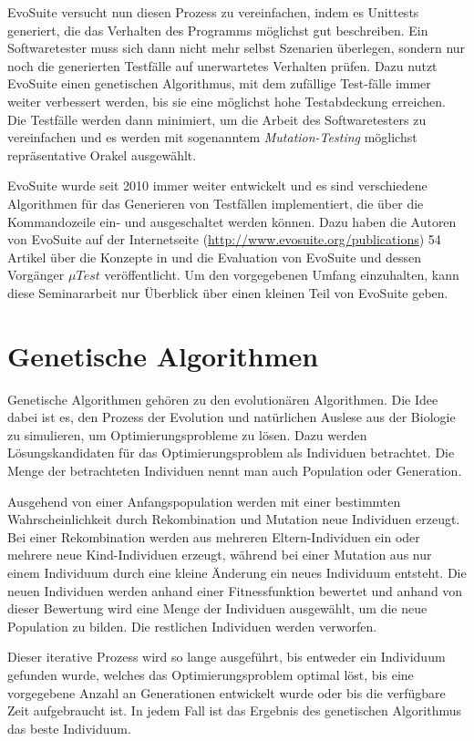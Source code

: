 \documentclass[a4paper,11pt]{article}
\begin{document}
EvoSuite versucht nun diesen Prozess zu vereinfachen, indem es Unittests generiert, die das Verhalten des Programms möglichst gut beschreiben.
Ein Softwaretester muss sich dann nicht mehr selbst Szenarien überlegen, sondern nur noch die generierten Testfälle auf unerwartetes Verhalten prüfen.
Dazu nutzt EvoSuite einen genetischen Algorithmus, mit dem zufällige Test-fälle immer weiter verbessert werden, bis sie eine möglichst hohe Testabdeckung erreichen.
Die Testfälle werden dann minimiert, um die Arbeit des Softwaretesters zu vereinfachen und es werden mit sogenanntem \textit{Mutation-Testing} möglichst repräsentative Orakel ausgewählt.

EvoSuite wurde seit 2010 immer weiter entwickelt und es sind verschiedene Algorithmen für das Generieren von Testfällen implementiert, die über die Kommandozeile ein- und ausgeschaltet werden können.
Dazu haben die Autoren von EvoSuite auf der Internetseite (\url{http://www.evosuite.org/publications}) 54 Artikel über die Konzepte in und die Evaluation von EvoSuite und dessen Vorgänger ${\mu}Test$ veröffentlicht.
Um den vorgegebenen Umfang einzuhalten, kann diese Seminararbeit nur Überblick über einen kleinen Teil von EvoSuite geben.

\section{Genetische Algorithmen}
\label{sec:genetische_algorithmen}

Genetische Algorithmen gehören zu den evolutionären Algorithmen.
Die Idee dabei ist es, den Prozess der Evolution und natürlichen Auslese aus der Biologie zu simulieren, um Optimierungsprobleme zu lösen.
Dazu werden Lösungskandidaten für das Optimierungsproblem als Individuen betrachtet.
Die Menge der betrachteten Individuen nennt man auch Population oder Generation.

Ausgehend von einer Anfangspopulation werden mit einer bestimmten Wahrscheinlichkeit durch Rekombination und Mutation neue Individuen erzeugt.
Bei einer Rekombination werden aus mehreren Eltern-Individuen ein oder mehrere neue Kind-Individuen erzeugt, während bei einer Mutation aus nur einem Individuum durch eine kleine Änderung ein neues Individuum entsteht.
Die neuen Individuen werden anhand einer Fitnessfunktion bewertet und anhand von dieser Bewertung wird eine Menge der Individuen ausgewählt, um die neue Population zu bilden.
Die restlichen Individuen werden verworfen.

Dieser iterative Prozess wird so lange ausgeführt, bis entweder ein Individuum gefunden wurde, welches das Optimierungsproblem optimal löst, bis eine vorgegebene Anzahl an Generationen entwickelt wurde oder bis die verfügbare Zeit aufgebraucht ist.
In jedem Fall ist das Ergebnis des genetischen Algorithmus das beste Individuum.
\end{document}
